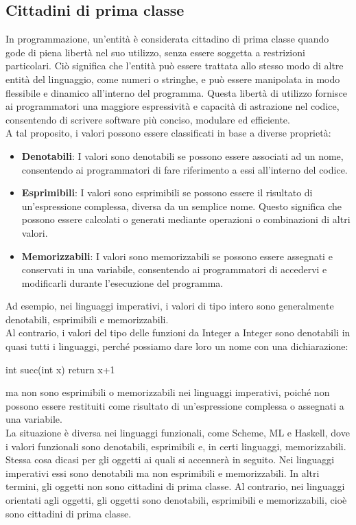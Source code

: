 \documentclass{article}
\begin{document}
	\subsection{Cittadini di prima classe}
	In programmazione, un'entità è considerata cittadino di prima classe quando gode di piena libertà nel suo utilizzo, senza essere soggetta a restrizioni particolari. Ciò significa che l'entità può essere trattata allo stesso modo di altre entità del linguaggio, come numeri o stringhe, e può essere manipolata in modo flessibile e dinamico all'interno del programma. Questa libertà di utilizzo fornisce ai programmatori una maggiore espressività e capacità di astrazione nel codice, consentendo di scrivere software più conciso, modulare ed efficiente.
	\vspace{\baselineskip} \\
	A tal proposito, i valori possono essere classificati in base a diverse proprietà:
	\begin{itemize}
		\item \textbf{Denotabili}: I valori sono denotabili se possono essere associati ad un nome, consentendo ai programmatori di fare riferimento a essi all'interno del codice.
		\item \textbf{Esprimibili}: I valori sono esprimibili se possono essere il risultato di un'espressione complessa, diversa da un semplice nome. Questo significa che possono essere calcolati o generati mediante operazioni o combinazioni di altri valori.
		\item \textbf{Memorizzabili}: I valori sono memorizzabili se possono essere assegnati e conservati in una variabile, consentendo ai programmatori di accedervi e modificarli durante l'esecuzione del programma.
	\end{itemize}
	Ad esempio, nei linguaggi imperativi, i valori di tipo intero sono generalmente denotabili, esprimibili e memorizzabili. \\
	Al contrario, i valori del tipo delle funzioni da Integer a Integer sono denotabili in quasi tutti i linguaggi, perché possiamo dare loro un nome con una dichiarazione:
	\begin{center}
		int succ(int x) { return x+1 }
	\end{center}
	ma non sono esprimibili o memorizzabili nei linguaggi imperativi, poiché non possono essere restituiti come risultato di un'espressione complessa o assegnati a una variabile.
	\vspace{\baselineskip} \\
	La situazione è diversa nei linguaggi funzionali, come Scheme, ML e Haskell, dove i valori funzionali sono denotabili, esprimibili e, in certi linguaggi, memorizzabili. Stessa cosa dicasi per gli oggetti ai quali si accennerà in seguito. Nei linguaggi imperativi essi sono denotabili ma non esprimibili e memorizzabili. In altri termini, gli oggetti non sono cittadini di prima classe. Al contrario, nei linguaggi orientati agli oggetti, gli oggetti sono denotabili, esprimibili e memorizzabili, cioè sono cittadini di prima classe.
\end{document}
